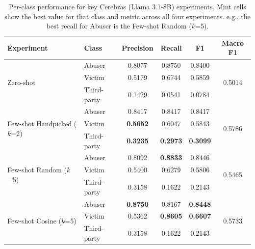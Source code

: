 \documentclass[12pt]{article}
\begin{document}
\begin{table}[H]
    \centering
    \renewcommand{\arraystretch}{1.4}
    \begin{tabular}{l l c c c c}
        \toprule
        \rowcolor{llmheader}
        \color{white}\textbf{Experiment} & \color{white}\textbf{Class} & \color{white}\textbf{Precision} & \color{white}\textbf{Recall} & \color{white}\textbf{F1} & \color{white}\textbf{Macro F1} \\
        \midrule
        \multirow{3}{*}{Zero-shot}
            & Abuser      & 0.8077 & 0.8750 & 0.8400 & \multirow{3}{*}{0.5014} \\
            & Victim      & 0.5179 & 0.6744 & 0.5859 & \\
            & Third-party & 0.1429 & 0.0541 & 0.0784 & \\
        \cmidrule{1-6}
        \multirow{3}{*}{Few-shot Handpicked ($k$=2)}
            & Abuser      & 0.8417 & 0.8417 & 0.8417 & \multirow{3}{*}{0.5786} \\
            & Victim      & \cellcolor{llmhighlight}\textbf{0.5652} & 0.6047 & 0.5843 & \\
            & Third-party & \cellcolor{llmhighlight}\textbf{0.3235} & \cellcolor{llmhighlight}\textbf{0.2973} & \cellcolor{llmhighlight}\textbf{0.3099} & \\
        \cmidrule{1-6}
        \multirow{3}{*}{Few-shot Random ($k$=5)}
            & Abuser      & 0.8092 & \cellcolor{llmhighlight}\textbf{0.8833} & 0.8446 & \multirow{3}{*}{0.5465} \\
            & Victim      & 0.5400 & 0.6279 & 0.5806 & \\
            & Third-party & 0.3158 & 0.1622 & 0.2143 & \\
        \cmidrule{1-6}
        \multirow{3}{*}{Few-shot Cosine ($k$=5)}
            & Abuser      & \cellcolor{llmhighlight}\textbf{0.8750} & 0.8167 & \cellcolor{llmhighlight}\textbf{0.8448} & \multirow{3}{*}{0.5733} \\
            & Victim      & 0.5362 & \cellcolor{llmhighlight}\textbf{0.8605} & \cellcolor{llmhighlight}\textbf{0.6607} & \\
            & Third-party & 0.3158 & 0.1622 & 0.2143 & \\
        \bottomrule
    \end{tabular}
    \caption{Per-class performance for key Cerebras (Llama 3.1-8B) experiments.
    Mint cells show the best value for that class and metric across all four experiments. e.g., 
    the best recall for Abuser is the Few-shot Random ($k$=5).}
    \label{tab:Cerebras-perclass}
\end{table}
\end{document}
